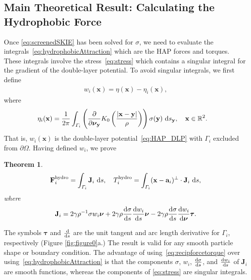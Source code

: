 \documentclass[lineno]{jfm}
\newtheorem{theorem}{Theorem}
\renewcommand{\aa}{\mathbf{a}}
\newcommand{\bd}{\partial}
\newcommand{\FF}{\mathbf{F}}
\newcommand{\JJ}{\mathbf{J}}
\newcommand{\nnu}{\boldsymbol{\nu}}
\newcommand{\ttau}{\boldsymbol{\tau}}
\newcommand{\xx}{\mathbf{x}}
\newcommand{\yy}{\mathbf{y}}
\newcommand{\pderiv}[2]{\frac{\partial #1}{\partial #2}}
\begin{document}
\subsection{Main Theoretical Result: Calculating the Hydrophobic Force}
\label{subsec:calculating_force}
Once \eqref{eq:screenedSKIE} has been solved for $\sigma$, we need to
evaluate the integrals~\eqref{eq:hydrophobicAttraction} which are the
HAP forces and torques. These integrals involve the
stress~\eqref{eq:stress} which contains a singular integral for the
gradient of the double-layer potential. To avoid singular integrals, we
first define
\begin{align}
  \label{eq:uidef}
  w_i(\xx) = \eta (\xx) - \eta _i(\xx),
\end{align}
where
\begin{align}
  \eta _i(\xx) &= \frac{1}{2\pi} \int_{\Gamma_i} \left(\pderiv{}{\nnu_\yy}
    K_0 \left(\frac{|\xx - \yy|}{\rho}\right)\right) 
    \sigma(\yy) \, \dif s_\yy, \quad \xx \in \mathbb{R}^2.
\end{align}
That is, $w_i(\xx)$ is the double-layer potential~\eqref{eq:HAP_DLP}
with $\Gamma_i$ excluded from $\bd\Omega$. Having defined $w_i$, we prove
\begin{theorem}
\begin{align}
  \label{eq:recipforcetorque}
  \FF_i^{\mathrm{hydro}} = \int_{\Gamma_i} \JJ_i \,\dif s,\quad
  T_i^{\mathrm{hydro}}    = \int_{\Gamma_i} 
    (\xx - \aa_i)^{\perp} \cdot \JJ_i  \,\dif s,
\end{align}
where
\begin{align}
  \label{eq:jumpstress1}
  \JJ_{i} = 2\gamma\rho^{-1} \sigma w_i \nnu + 
    2\gamma\rho \frac{\dif \sigma}{\dif s} \frac{\dif w_i}{\dif s} \nnu -
    2\gamma\rho \frac{\dif \sigma}{\dif s} \frac{\dif w_i}{\dif \nnu} \ttau.
\end{align}
\end{theorem}
The symbols $\ttau$ and $\frac{\dif }{\dif s}$ are the unit tangent and arc
length derivative for $\Gamma_i$, respectively (Figure
\ref{fig:figure0}a.) The result is valid for any smooth particle shape
or boundary condition. The advantage of
using~\eqref{eq:recipforcetorque} over
using~\eqref{eq:hydrophobicAttraction} is that the components $\sigma$,
$w_i$, $\frac{\dif \sigma}{\dif s}$, and $\frac{\dif w_i}{\dif s}$ of $\JJ_i$ are smooth
functions, whereas the components of \eqref{eq:stress} are singular
integrals. 
\end{document}
